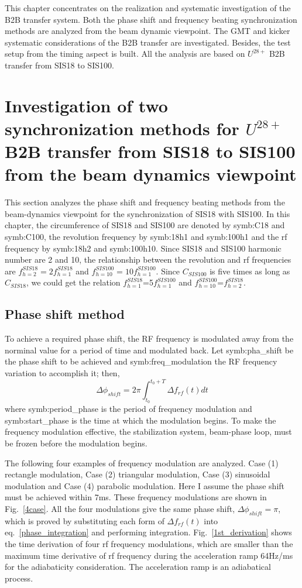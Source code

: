 This chapter concentrates on the realization and systematic investigation of the \gls{B2B} transfer system. Both the phase shift and frequency beating synchronization methods are analyzed from the beam dynamic viewpoint. The \gls{GMT} and kicker systematic considerations of the B2B transfer are investigated. Besides, the test setup from the timing aspect is built. All the analysis are based on $U^{28+}$ B2B transfer from SIS18 to SIS100.
\section{Investigation of two synchronization methods for $U^{28+}$ B2B transfer from SIS18 to SIS100 from the beam dynamics viewpoint }
This section analyzes the phase shift and frequency beating methods from the beam-dynamics viewpoint for the synchronization of SIS18 with SIS100. In this chapter, the circumference of SIS18 and SIS100 are denoted by \gls{symb:C18} and \gls{symb:C100}, the revolution frequency by \gls{symb:18h1} and \gls{symb:100h1} and the rf frequency by \gls{symb:18h2} and \gls{symb:100h10}. Since SIS18 and SIS100 harmonic number are 2 and 10, the relationship between the revolution and rf frequencies are $f_{h=2}^{SIS18}=2f_{h=1}^{SIS18}$ and $f_{h=10}^{SIS100}=10f_{h=1}^{SIS100}$. Since $C_{SIS100}$ is five times as long as $C_{SIS18}$, we could get the relation  $f_{h=1}^{SIS18}$=5$f_{h=1}^{SIS100}$ and $f_{h=10}^{SIS100}$=$f_{h=2}^{SIS18}$.
\subsection{Phase shift method}
To achieve a required phase shift, the \gls{RF} frequency is modulated away from the norminal value for a period of time and modulated back. Let \gls{symb:pha_shift} be the phase shift to be achieved and \gls{symb:freq_modulation} the RF frequency variation to accomplish it; then,
\begin{equation}
\Delta \phi_{shift}= 2\pi \int_{t_0}^{t_0+T} \Delta f_{rf}(t)dt \label{phase_integration}
\end{equation}
where \gls{symb:period_phase} is the period of frequency modulation and \gls{symb:start_phase} is the time at which the modulation begins. To make the frequency modulation effective, the stabilization system, beam-phase loop, must be frozen before the modulation begins. 

The following four examples of frequency modulation are analyzed. Case (1) rectangle modulation, Case (2) triangular modulation, Case (3) sinusoidal modulation and Case (4) parabolic modulation. Here I assume the phase shift must be achieved within 7ms. These frequency modulations are shown in Fig.~\ref{4case}. All the four modulations give the same phase shift, $\Delta \phi_{shift}=\pi$, which is
proved by substituting each form of $\Delta f_{rf}(t)$ into eq.~\ref{phase_integration} and performing integration. Fig.~\ref{1st_derivation} shows the time derivation of four rf frequency modulations, which are smaller than the maximum time derivative of rf frequency during the acceleration ramp 64Hz/ms for the adiabaticity consideration. The acceleration ramp is an adiabatical process.

